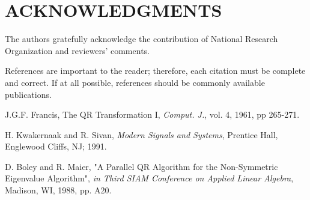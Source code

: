 \documentclass[letterpaper, 10 pt, conference]{ieeeconf}  %
\begin{document}
\section{ACKNOWLEDGMENTS}

The authors gratefully acknowledge the contribution of National Research Organization and reviewers' comments.



References are important to the reader; therefore, each citation must be complete and correct. If at all possible, references should be commonly available publications.

\begin{thebibliography}{99}

J.G.F. Francis, The QR Transformation I, {\it Comput. J.}, vol. 4, 1961, pp 265-271.

H. Kwakernaak and R. Sivan, {\it Modern Signals and Systems}, Prentice Hall, Englewood Cliffs, NJ; 1991.

D. Boley and R. Maier, "A Parallel QR Algorithm for the Non-Symmetric Eigenvalue Algorithm", {\it in Third SIAM Conference on Applied Linear Algebra}, Madison, WI, 1988, pp. A20.

\end{thebibliography}
\end{document}
